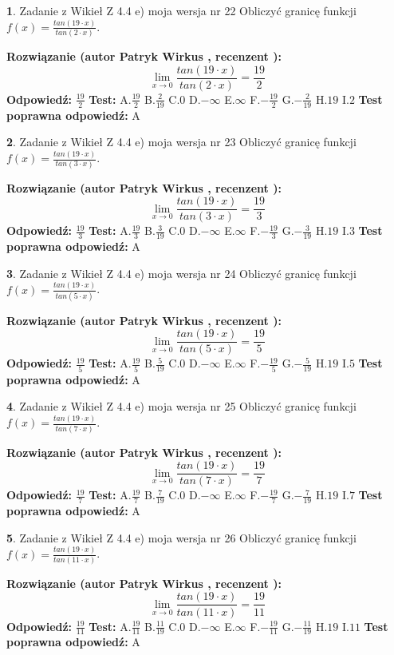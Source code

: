 \documentclass[12pt, a4paper]{article}
\theoremstyle{definition} %
\newtheorem{zad}{}
\newcommand{\zadStart}[1]{\begin{zad}#1\newline}
\newcommand{\zadStop}{\end{zad}}
\newcommand{\rozwStart}[2]{\noindent \textbf{Rozwiązanie (autor #1 , recenzent #2): }\newline}
\newcommand{\rozwStop}{\newline}
\newcommand{\odpStart}{\noindent \textbf{Odpowiedź:}\newline}
\newcommand{\odpStop}{\newline}
\newcommand{\testStart}{\noindent \textbf{Test:}\newline}
\newcommand{\testStop}{\newline}
\newcommand{\kluczStart}{\noindent \textbf{Test poprawna odpowiedź:}\newline}
\newcommand{\kluczStop}{\newline}
\begin{document}
\zadStart{Zadanie z Wikieł Z 4.4 e) moja wersja nr 22}
Obliczyć granicę funkcji $f(x)=\frac{tan(19\cdot x)}{tan(2\cdot x)}$.
\zadStop
\rozwStart{Patryk Wirkus}{}
$$\lim\limits_{x\to 0}\frac{tan(19\cdot x)}{tan(2\cdot x)}=
\frac{19}{2}$$
\rozwStop
\odpStart
$\frac{19}{2}$
\odpStop
\testStart
A.$\frac{19}{2}$
B.$\frac{2}{19}$
C.$0$
D.$-\infty$
E.$\infty$
F.$-\frac{19}{2}$
G.$-\frac{2}{19}$
H.$19$
I.$2$
\testStop
\kluczStart
A
\kluczStop



\zadStart{Zadanie z Wikieł Z 4.4 e) moja wersja nr 23}
Obliczyć granicę funkcji $f(x)=\frac{tan(19\cdot x)}{tan(3\cdot x)}$.
\zadStop
\rozwStart{Patryk Wirkus}{}
$$\lim\limits_{x\to 0}\frac{tan(19\cdot x)}{tan(3\cdot x)}=
\frac{19}{3}$$
\rozwStop
\odpStart
$\frac{19}{3}$
\odpStop
\testStart
A.$\frac{19}{3}$
B.$\frac{3}{19}$
C.$0$
D.$-\infty$
E.$\infty$
F.$-\frac{19}{3}$
G.$-\frac{3}{19}$
H.$19$
I.$3$
\testStop
\kluczStart
A
\kluczStop



\zadStart{Zadanie z Wikieł Z 4.4 e) moja wersja nr 24}
Obliczyć granicę funkcji $f(x)=\frac{tan(19\cdot x)}{tan(5\cdot x)}$.
\zadStop
\rozwStart{Patryk Wirkus}{}
$$\lim\limits_{x\to 0}\frac{tan(19\cdot x)}{tan(5\cdot x)}=
\frac{19}{5}$$
\rozwStop
\odpStart
$\frac{19}{5}$
\odpStop
\testStart
A.$\frac{19}{5}$
B.$\frac{5}{19}$
C.$0$
D.$-\infty$
E.$\infty$
F.$-\frac{19}{5}$
G.$-\frac{5}{19}$
H.$19$
I.$5$
\testStop
\kluczStart
A
\kluczStop



\zadStart{Zadanie z Wikieł Z 4.4 e) moja wersja nr 25}
Obliczyć granicę funkcji $f(x)=\frac{tan(19\cdot x)}{tan(7\cdot x)}$.
\zadStop
\rozwStart{Patryk Wirkus}{}
$$\lim\limits_{x\to 0}\frac{tan(19\cdot x)}{tan(7\cdot x)}=
\frac{19}{7}$$
\rozwStop
\odpStart
$\frac{19}{7}$
\odpStop
\testStart
A.$\frac{19}{7}$
B.$\frac{7}{19}$
C.$0$
D.$-\infty$
E.$\infty$
F.$-\frac{19}{7}$
G.$-\frac{7}{19}$
H.$19$
I.$7$
\testStop
\kluczStart
A
\kluczStop



\zadStart{Zadanie z Wikieł Z 4.4 e) moja wersja nr 26}
Obliczyć granicę funkcji $f(x)=\frac{tan(19\cdot x)}{tan(11\cdot x)}$.
\zadStop
\rozwStart{Patryk Wirkus}{}
$$\lim\limits_{x\to 0}\frac{tan(19\cdot x)}{tan(11\cdot x)}=
\frac{19}{11}$$
\rozwStop
\odpStart
$\frac{19}{11}$
\odpStop
\testStart
A.$\frac{19}{11}$
B.$\frac{11}{19}$
C.$0$
D.$-\infty$
E.$\infty$
F.$-\frac{19}{11}$
G.$-\frac{11}{19}$
H.$19$
I.$11$
\testStop
\kluczStart
A
\kluczStop
\end{document}
